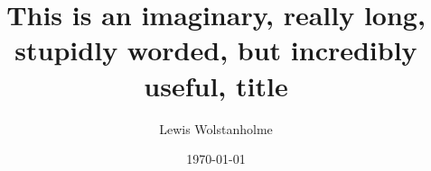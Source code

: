 \documentclass[a4paper, 11pt]{report}
\begin{document}
	\title{This is an imaginary, really long, stupidly worded, but incredibly useful, title}
	\author{Lewis Wolstanholme}
	\date{\getDate\today}
	\maketitle
	\tableofcontents

	\nocite{*}

	
\end{document}
